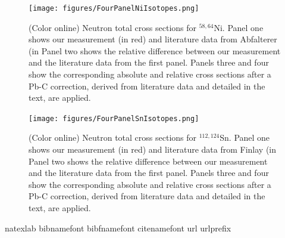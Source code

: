 \documentclass[twocolumn,secnumarabic,amssymb, nobibnotes, aps, prl,
superscriptaddress, nobalancelastpage]{revtex4}
\begin{document}
\begin{figure}
    \texttt{[image: figures/FourPanelNiIsotopes.png]}
    \caption{(Color online) Neutron total cross sections for $^{58,64}$Ni.
     Panel one shows our measurement (in red) and literature data from
     Abfalterer (in %
     Panel two shows the relative difference between our 
     measurement and the literature data from the first panel. Panels three and
     four show the corresponding absolute and relative cross sections after a
     Pb-C correction, derived from literature data and detailed in the text,
     are applied.
    }
\end{figure}

\begin{figure}
    \texttt{[image: figures/FourPanelSnIsotopes.png]}
    \caption{(Color online) Neutron total cross sections for $^{112,124}$Sn.
     Panel one shows our measurement (in red) and literature data from
     Finlay (in %
     Panel two shows the relative difference between our 
     measurement and the literature data from the first panel. Panels three and
     four show the corresponding absolute and relative cross sections after a
     Pb-C correction, derived from literature data and detailed in the text,
     are applied.
    }
\end{figure}



\begin{thebibliography}{32} \expandafter\ifx\csname
        natexlab\endcsname\relax\def\natexlab#1{#1}\fi \expandafter\ifx\csname
        bibnamefont\endcsname\relax \def\bibnamefont#1{#1}\fi
        \expandafter\ifx\csname bibfnamefont\endcsname\relax
        \def\bibfnamefont#1{#1}\fi \expandafter\ifx\csname
        citenamefont\endcsname\relax \def\citenamefont#1{#1}\fi
        \expandafter\ifx\csname url\endcsname\relax \def\url#1{\texttt{#1}}\fi
        \expandafter\ifx\csname urlprefix\endcsname\relax\def\urlprefix{URL
        }\fi \providecommand{\bibinfo}[2]{#2}
        \providecommand{\eprint}[2][]{\url{#2}}

\end{thebibliography}
\end{document}
